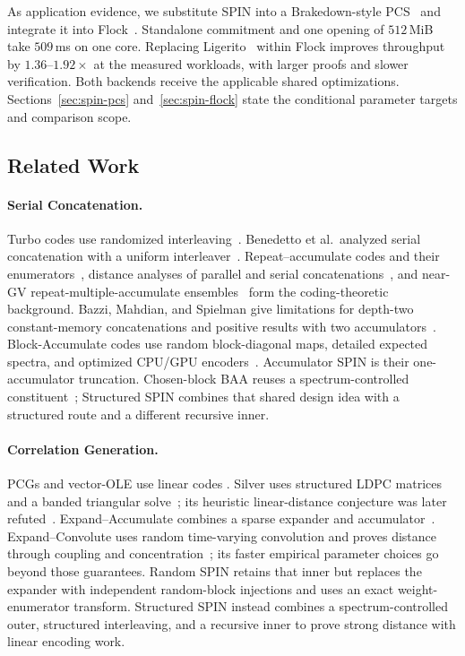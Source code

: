 As application evidence, we substitute SPIN into a Brakedown-style
PCS~\cite{brakedown23} and integrate it into Flock~\cite{flock26}.
Standalone commitment and one opening of $512$\,MiB take $509$\,ms on one
core. Replacing Ligerito~\cite{ligerito25} within Flock improves throughput
by $1.36$--$1.92\times$ at the measured workloads, with larger proofs and
slower verification. Both backends receive the applicable shared
optimizations. Sections~\ref{sec:spin-pcs} and~\ref{sec:spin-flock}
state the conditional parameter targets and comparison scope.

\subsection{Related Work}

\paragraph{Serial Concatenation.}
Turbo codes use randomized interleaving~\cite{berrou93}.
Benedetto et al.\ analyzed serial concatenation with a uniform
interleaver~\cite{benedetto98}. Repeat--accumulate codes and their
enumerators~\cite{divsalar98}, distance analyses of parallel and serial
concatenations~\cite{kahale98}, and near-GV repeat-multiple-accumulate
ensembles~\cite{kliewer08} form the coding-theoretic background.
Bazzi, Mahdian, and Spielman give limitations for depth-two constant-memory
concatenations and positive results with two accumulators~\cite{bms09}.
Block-Accumulate codes use random block-diagonal maps, detailed expected
spectra, and optimized CPU/GPU encoders~\cite{KolesnikovEtAl2026BA}.
Accumulator SPIN is their one-accumulator truncation. Chosen-block BAA
reuses a spectrum-controlled constituent~\cite{cryptoeprint:2026/1903};
Structured SPIN combines that shared design idea with a structured route
and a different recursive inner.

\paragraph{Correlation Generation.}
PCGs and vector-OLE use linear codes
\cite{bcgi18,bcg19pcg,bcg19tworound,ferret20,bcg20ring}.
Silver uses structured LDPC matrices and a banded triangular
solve~\cite{CouteauRindalRaghuraman2021Silver}; its heuristic
linear-distance conjecture was later refuted~\cite{RaghuramanRindalTanguy2023EC}.
Expand--Accumulate combines a sparse expander and accumulator~\cite{ea22}.
Expand--Convolute uses random time-varying convolution and proves distance
through coupling and concentration~\cite{RaghuramanRindalTanguy2023EC};
its faster empirical parameter choices go beyond those guarantees.
Random SPIN retains that inner but replaces the expander with independent
random-block injections and uses an exact weight-enumerator transform.
Structured SPIN instead combines a spectrum-controlled outer, structured
interleaving, and a recursive inner to prove strong distance with linear encoding work.

